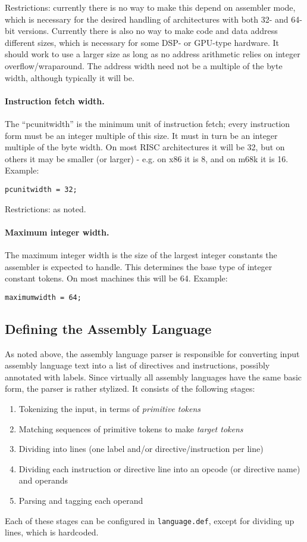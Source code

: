 Restrictions: currently there is no way to make this depend on
assembler mode, which is necessary for the desired handling of
architectures with both 32- and 64-bit versions.
Currently there is also no way to make code and data address different
sizes, which is necessary for some DSP- or GPU-type hardware.
It should work to use a larger size as long as no address arithmetic
relies on integer overflow/wraparound.
The address width need not be a multiple of the byte width, although
typically it will be.

\paragraph{Instruction fetch width.}
The ``pcunitwidth'' is the minimum unit of instruction fetch; every
instruction form must be an integer multiple of this size.
It must in turn be an integer multiple of the byte width.
On most RISC architectures it will be 32, but on others it may be
smaller (or larger) - e.g. on x86 it is 8, and on m68k it is 16.
Example:
\begin{verbatim}
pcunitwidth = 32;
\end{verbatim}

Restrictions: as noted.

\paragraph{Maximum integer width.}
The maximum integer width is the size of the largest integer constants
the assembler is expected to handle.
This determines the base type of integer constant tokens.
On most machines this will be 64.
Example:
\begin{verbatim}
maximumwidth = 64;
\end{verbatim}


\subsection{Defining the Assembly Language}

As noted above, the assembly language parser is responsible for
converting input assembly language text into a list of directives and
instructions, possibly annotated with labels.
Since virtually all assembly languages have the same basic form,
the parser is rather stylized.
It consists of the following stages:
\begin{enumerate}
\item Tokenizing the input, in terms of \emph{primitive tokens}
\item Matching sequences of primitive tokens to make \emph{target tokens}
\item Dividing into lines (one label and/or directive/instruction per line)
\item Dividing each instruction or directive line into an opcode (or
directive name) and operands
\item Parsing and tagging each operand 
\end{enumerate}
Each of these stages can be configured in \texttt{language.def},
except for dividing up lines, which is hardcoded.

